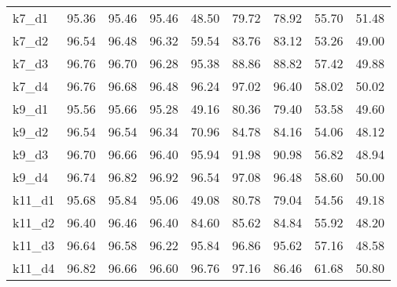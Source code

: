 \begin{table}[htbp]
\begin{minipage}{0.9\textwidth}
{\begin{tabular}{lcccccccc}
            k7\_d1 & 95.36 & 95.46 & 95.46 & 48.50 & 79.72 & 78.92 & 55.70 & 51.48 \\
            k7\_d2 & 96.54 & 96.48 & 96.32 & 59.54 & 83.76 & 83.12 & 53.26 & 49.00 \\
            k7\_d3 & 96.76 & 96.70 & 96.28 & 95.38 & 88.86 & 88.82 & 57.42 & 49.88 \\
            k7\_d4 & 96.76 & 96.68 & 96.48 & 96.24 & 97.02 & 96.40 & 58.02 & 50.02 \\
            k9\_d1 & 95.56 & 95.66 & 95.28 & 49.16 & 80.36 & 79.40 & 53.58 & 49.60 \\
            k9\_d2 & 96.54 & 96.54 & 96.34 & 70.96 & 84.78 & 84.16 & 54.06 & 48.12 \\
            k9\_d3 & 96.70 & 96.66 & 96.40 & 95.94 & 91.98 & 90.98 & 56.82 & 48.94 \\
            k9\_d4 & 96.74 & 96.82 & 96.92 & 96.54 & 97.08 & 96.48 & 58.60 & 50.00 \\
            k11\_d1 & 95.68 & 95.84 & 95.06 & 49.08 & 80.78 & 79.04 & 54.56 & 49.18 \\
            k11\_d2 & 96.40 & 96.46 & 96.40 & 84.60 & 85.62 & 84.84 & 55.92 & 48.20 \\
            k11\_d3 & 96.64 & 96.58 & 96.22 & 95.84 & 96.86 & 95.62 & 57.16 & 48.58 \\
            k11\_d4 & 96.82 & 96.66 & 96.60 & 96.76 & 97.16 & 86.46 & 61.68 & 50.80 \\
            \bottomrule
        \end{tabular}
        }
    \end{minipage}
    \label{nt_dilation_kernel}
\end{table}



